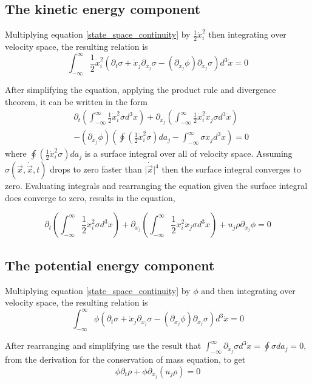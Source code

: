 \documentclass[%
 twocolumn,
 preprint, onecolumn,
 amsmath,amssymb,
 aps,
]{revtex4-1}
\newcommand{\dvec}[1]{\dot{\vec{#1}}}
\newcommand{\intVdot}[1]{\int_{-\infty}^{\infty} #1 d^3\dot{x}}
\begin{document}
\subsection{The kinetic energy component}
Multiplying equation \eqref{state_space_continuity} by $\frac{1}{2}\dot{x}_i^2$ then integrating over velocity space, the resulting relation is
\[
\intVdot{\frac{1}{2}\dot{x}_i^2\left(\partial_t \sigma + \dot{x}_j\partial_{x_j}\sigma-\left(\partial_{x_j}\phi\right)\partial_{\dot{x}_j}\sigma\right)}=0
\]

After simplifying the equation, applying the product rule and divergence theorem, it can be written in the form
\[
\begin{split}
& \partial_t\left(\intVdot{\frac{1}{2}\dot{x}_i^2\sigma}\right) + \partial_{x_j}\left(\intVdot{\frac{1}{2}\dot{x}_i^2\dot{x}_j\sigma}\right) \\ & -  \left(\partial_{x_j}\phi\right)\left(\oint\left(\frac{1}{2}\dot{x}_i^2\sigma\right)da_j - \intVdot{\sigma\dot{x}_j}\right)=0
\end{split}
\]
where $\oint\left(\frac{1}{2}\dot{x}_i^2\sigma\right)da_j$ is a surface integral over all of velocity space. Assuming $\sigma(\vec{x}, \dvec{x}, t)$ drops to zero faster than $\lvert\dvec{x}\rvert^4$ then the surface integral converges to zero. Evaluating integrals and rearranging the equation given the surface integral does converge to zero, results in the equation,

\begin{equation}
\partial_t\left(\intVdot{\frac{1}{2}\dot{x}_i^2\sigma}\right) + \partial_{x_j}\left(\intVdot{\frac{1}{2}\dot{x}_i^2\dot{x}_j\sigma}\right) + u_j\rho\partial_{x_j}\phi=0
\label{incomplete_conservation_of_energy_kinetic}
\end{equation}

\subsection{The potential energy component}
Multiplying equation \eqref{state_space_continuity} by $\phi$ and then integrating over velocity space, the resulting relation is
\[
\intVdot{\phi\left(\partial_t \sigma + \dot{x}_j\partial_{x_j}\sigma-\left(\partial_{x_j}\phi\right)\partial_{\dot{x}_j}\sigma\right)}=0
\]

After rearranging and simplifying use the result that $\intVdot{\partial_{\dot{x}_j}\sigma}=\oint\sigma da_j = 0$, from the derivation for the conservation of mass equation, to get
\[
\phi\partial_t\rho + \phi\partial_{x_j}\left(u_j\rho\right)=0
\]
\end{document}
